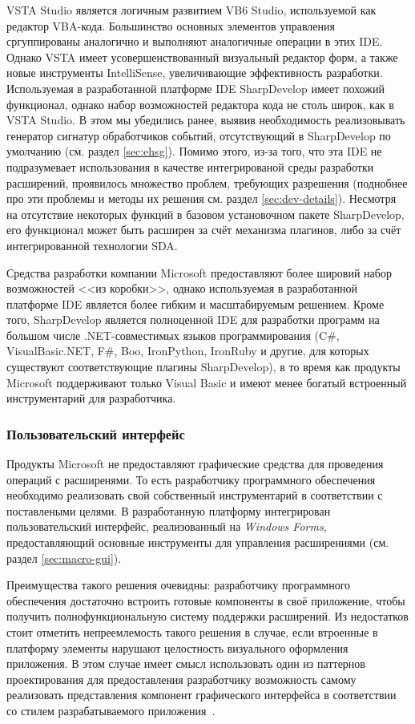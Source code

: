 VSTA Studio является логичным развитием VB6 Studio, используемой как редактор VBA-кода. Большинство основных элементов управления сргуппированы аналогично и выполняют аналогичные операции в этих IDE. Однако VSTA имеет усовершенствованный визуальный редактор форм, а также новые инструменты IntelliSense, увеличивающие эффективность разработки. Используемая в разработанной платформе IDE SharpDevelop имеет похожий функционал, однако набор возможностей редактора кода не столь широк, как в VSTA Studio. В этом мы убедились ранее, выявив необходимость реализовывать генератор сигнатур обработчиков событий, отсутствующий в SharpDevelop по умолчанию (см. раздел \ref{sec:ehsg}). Помимо этого, из-за того, что эта IDE не подразумевает использования в качестве интегрированой среды разработки расширений, проявилось множество проблем, требующих разрешения (поднобнее про эти проблемы и методы их решения см. раздел \ref{sec:dev-details}). Несмотря на отсутствие некоторых функций в базовом установочном пакете SharpDevelop, его функционал может быть расширен за счёт механизма плагинов, либо за счёт интегрированной технологии SDA.

Средства разработки компании Microsoft предоставляют более шировий набор возможностей <<из коробки>>, однако используемая в разработанной платформе IDE является более гибким и масштабируемым решением. Кроме того, SharpDevelop является полноценной IDE для разработки программ на большом числе .NET-совместимых языков программирования (C\#, VisualBasic.NET, F\#, Boo, IronPython, IronRuby и другие, для которых существуют соответствующие плагины SharpDevelop), в то время как продукты Microsoft поддерживают только Visual Basic и имеют менее богатый встроенный инструментарий для разработчика.

\subsubsection{Пользовательский интерфейс}

Продукты Microsoft не предоставляют графические средства для проведения операций с расширенями. То есть разработчику программного обеспечения необходимо реализовать свой собственный инструментарий в соответствии с поставлеными целями. В разработанную платформу интегрирован пользовательский интерфейс, реализованный на {\it Windows Forms}, предоставляющий основные инструменты для управления расширениями (см. раздел \ref{sec:macro-gui}).

Преимущества такого решения очевидны: разработчику программного обеспечения достаточно встроить готовые компоненты в своё приложение, чтобы получить полнофункциональную систему поддержки расширений. Из недостатков стоит отметить непреемлемость такого решения в случае, если втроенные в платформу элементы нарушают целостность визуального оформления приложения. В этом случае имеет смысл использовать один из паттернов проектирования для предоставления разработчику возможность самому реализовать представления компонент графического интерфейса в соответствии со стилем разрабатываемого приложения~\cite{band-four}.

